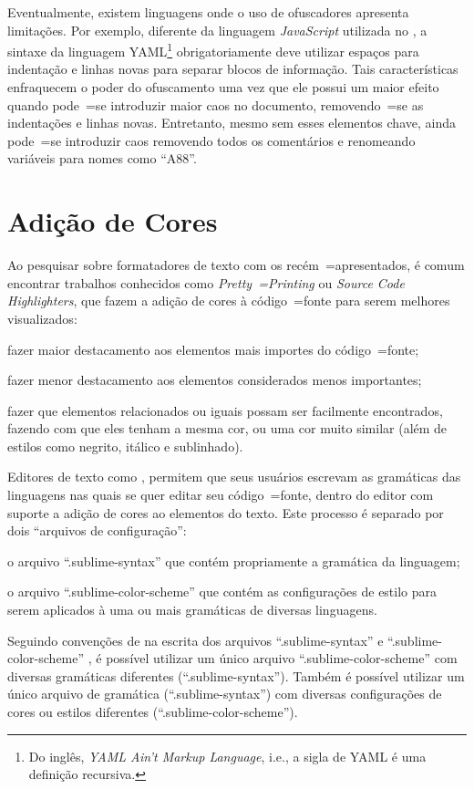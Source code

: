 Eventualmente,
existem linguagens onde o uso de ofuscadores apresenta limitações.
Por exemplo,
diferente da linguagem \textit{JavaScript} utilizada no ,
a sintaxe da linguagem YAML\footnote{
Do inglês,
\textit{YAML Ain't Markup Language},
i.e.,
a sigla de YAML é uma definição recursiva.
}
\cite{yamlSpecificModelChecking} obrigatoriamente deve utilizar espaços para indentação e
linhas novas para separar blocos de informação.
Tais características enfraquecem o poder do ofuscamento uma vez que ele possui um maior efeito quando pode~=se introduzir maior caos no documento,
removendo~=se as indentações e
linhas novas. Entretanto,
mesmo sem esses elementos chave,
ainda pode~=se introduzir caos removendo todos os comentários e
renomeando variáveis para nomes  como ``A88''.


\section{Adição de Cores}
\label{section:sourceCodeHighlighters}

Ao pesquisar sobre formatadores de texto com os recém~=apresentados,
é comum encontrar trabalhos conhecidos como \textit{Pretty~=Printing} ou
\textit{Source Code Highlighters},
que fazem a adição de cores à código~=fonte para serem melhores visualizados:
\begin{inparaenum}[1)]
\item fazer maior destacamento aos elementos mais importes do código~=fonte;
\item fazer menor destacamento aos elementos considerados menos importantes;
\item fazer que elementos relacionados ou
iguais possam ser facilmente encontrados,
fazendo com que eles tenham a mesma cor,
ou uma cor muito similar (além de estilos como negrito,
itálico e
sublinhado).
\end{inparaenum}%

Editores de texto como ,
permitem que seus usuários escrevam as gramáticas das linguagens nas quais se quer editar seu código~=fonte,
dentro do editor com suporte a adição de cores ao elementos do texto.
Este processo é separado por dois ``arquivos de configuração'':
\begin{inparaenum}[1)]
\item o arquivo ``.sublime-syntax'' que contém propriamente a gramática da linguagem;
\item o arquivo ``.sublime-color-scheme'' que contém as configurações de estilo para serem aplicados à uma ou
mais gramáticas de diversas linguagens.
\end{inparaenum}%
Seguindo convenções de na escrita dos arquivos ``.sublime-syntax'' \cite{sublimeTextScopeNaming} e
``.sublime-color-scheme'' \cite{sublimeTextColorSchemes},
é possível utilizar um único arquivo ``.sublime-color-scheme'' com diversas gramáticas diferentes (``.sublime-syntax'').
Também é possível utilizar um único arquivo  de gramática (``.sublime-syntax'') com diversas configurações de cores ou
estilos diferentes (``.sublime-color-scheme'').


